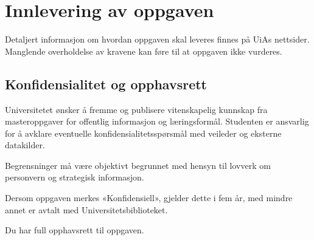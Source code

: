 \chapter{Innlevering av oppgaven}

Detaljert informasjon om hvordan oppgaven skal leveres finnes på UiAs nettsider. Manglende overholdelse av kravene kan føre til at oppgaven ikke vurderes.

\section{Konfidensialitet og opphavsrett}

Universitetet ønsker å fremme og publisere vitenskapelig kunnskap fra masteroppgaver for offentlig informasjon og læringsformål. Studenten er ansvarlig for å avklare eventuelle konfidensialitetsspørsmål med veileder og eksterne datakilder.

Begrensninger må være objektivt begrunnet med hensyn til lovverk om personvern og strategisk informasjon.

Dersom oppgaven merkes «Konfidensiell», gjelder dette i fem år, med mindre annet er avtalt med Universitetsbiblioteket.

Du har full opphavsrett til oppgaven.

